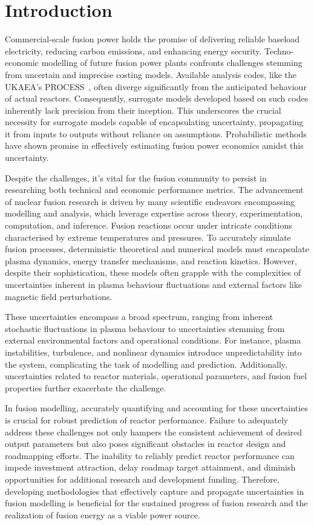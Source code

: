 \documentclass[journal]{IEEEtran}
\begin{document}
\section{Introduction}

Commercial-scale fusion power holds the promise of delivering reliable baseload electricity, reducing carbon emissions, and enhancing energy security. Techno-economic modelling of future fusion power plants confronts challenges stemming from uncertain and imprecise costing models. Available analysis codes, like the UKAEA's PROCESS~\cite{Kovari2014,Kovari2016}, often diverge significantly from the anticipated behaviour of actual reactors. Consequently, surrogate models developed based on such codes inherently lack precision from their inception. This underscores the crucial necessity for surrogate models capable of encapsulating uncertainty, propagating it from inputs to outputs without reliance on assumptions. Probabilistic methods have shown promise in effectively estimating fusion power economics amidst this uncertainty.

Despite the challenges, it's vital for the fusion community to persist in researching both technical and economic performance metrics. The advancement of nuclear fusion research is driven by many scientific endeavors encompassing modelling and analysis, which leverage expertise across theory, experimentation, computation, and inference. Fusion reactions occur under intricate conditions characterised by extreme temperatures and pressures. To accurately simulate fusion processes, deterministic theoretical and numerical models must encapsulate plasma dynamics, energy transfer mechanisms, and reaction kinetics. However, despite their sophistication, these models often grapple with the complexities of uncertainties inherent in plasma behaviour fluctuations and external factors like magnetic field perturbations. 

These uncertainties encompass a broad spectrum, ranging from inherent stochastic fluctuations in plasma behaviour to uncertainties stemming from external environmental factors and operational conditions. For instance, plasma instabilities, turbulence, and nonlinear dynamics introduce unpredictability into the system, complicating the task of modelling and prediction. Additionally, uncertainties related to reactor materials, operational parameters, and fusion fuel properties further exacerbate the challenge.

In fusion modelling, accurately quantifying and accounting for these uncertainties is crucial for robust prediction of reactor performance. Failure to adequately address these challenges not only hampers the consistent achievement of desired output parameters but also poses significant obstacles in reactor design and roadmapping efforts. The inability to reliably predict reactor performance can impede investment attraction, delay roadmap target attainment, and diminish opportunities for additional research and development funding. Therefore, developing methodologies that effectively capture and propagate uncertainties in fusion modelling is beneficial for the sustained progress of fusion research and the realization of fusion energy as a viable power source.
\end{document}
